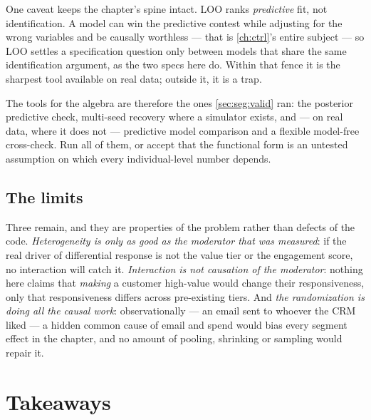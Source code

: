 One caveat keeps the chapter's spine intact. LOO ranks \emph{predictive} fit, not identification. A
model can win the predictive contest while adjusting for the wrong variables and be causally
worthless --- that is \cref{ch:ctrl}'s entire subject --- so LOO settles a specification question only
between models that share the same identification argument, as the two specs here do. Within that
fence it is the sharpest tool available on real data; outside it, it is a trap.

The tools for the algebra are therefore the ones \cref{sec:seg:valid} ran: the posterior predictive
check, multi-seed recovery where a simulator exists, and --- on real data, where it does not ---
predictive model comparison and a flexible model-free cross-check. Run all of them, or accept that
the functional form is an untested assumption on which every individual-level number depends.

\subsection*{The limits}

Three remain, and they are properties of the problem rather than defects of the code.
\emph{Heterogeneity is only as good as the moderator that was measured}: if the real driver of
differential response is not the value tier or the engagement score, no interaction will catch it.
\emph{Interaction is not causation of the moderator}: nothing here claims that \emph{making} a
customer high-value would change their responsiveness, only that responsiveness differs across
pre-existing tiers. And \emph{the randomization is doing all the causal work}: observationally --- an
email sent to whoever the CRM liked --- a hidden common cause of email and spend would bias every
segment effect in the chapter, and no amount of pooling, shrinking or sampling would repair it.

\section{Takeaways}
\label{sec:seg:take}

